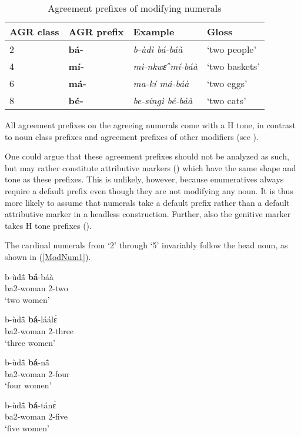 \begin{table} 
\centering
\begin{tabular}{ll|ll}
 \midrule
AGR class & AGR prefix & Example & Gloss \\
  \midrule
2 & {\bfseries bá-} & {\itshape b-ùdì bá-báà} & `two people' \\
4 & {\bfseries mí-} & {\itshape mi-nkwɛ̂ mí-báà} & `two baskets' \\
6 & {\bfseries má-} & {\itshape ma-kí má-báà} & `two eggs' \\
8 & {\bfseries bé-} & {\itshape be-síngì bé-báà} & `two cats' \\
  \midrule
\end{tabular}
\caption{Agreement prefixes of modifying numerals}
\label{tab:NumPre}
\end{table}

\noindent All agreement prefixes on the agreeing numerals come with a H tone, in contrast to noun class prefixes and agreement prefixes of other modifiers (see ).

One could argue that these agreement prefixes should not be analyzed as such, but may rather constitute attributive markers () which have the same shape and tone as these prefixes. This is unlikely, however, because enumeratives always require a default prefix even though they are not modifying any noun. It is thus more likely to assume that numerals take a default prefix rather than a default attributive marker in a headless construction. Further, also the genitive marker takes H tone prefixes ().

The cardinal numerals from `2' through `5'  invariably follow the head noun, as shown in (\ref{ModNum1}).

\begin {exe}
\ex\label {ModNum1}
\begin{xlist}
\parbox[t]{2in}{\ex \gll b-ùdã̂ {\bfseries bá}-báà\\ 
ba2-woman 2-two \\
 `two women'}
\parbox[t]{2in}{ \ex \gll 
b-ùdã̂ {\bfseries bá}-láálɛ̀ \\
   ba2-woman 2-three \\
 `three women'}


\parbox[t]{2in}{ \ex \gll 
b-ùdã̂ {\bfseries bá}-nã̂\\ 
ba2-woman 2-four \\
`four women'}
\parbox[t]{2in}{ \ex \gll 
b-ùdã̂ {\bfseries bá}-tánɛ̀ \\
   ba2-woman 2-five \\
`five women'}
\end{xlist}
\end {exe}

